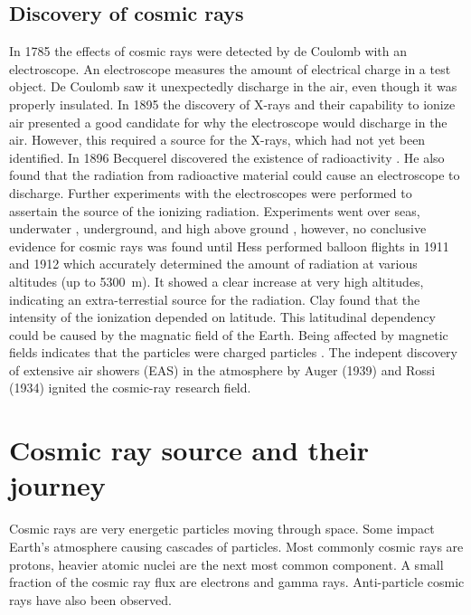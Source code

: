 \subsection{Discovery of cosmic rays}

In 1785 the effects of cosmic rays were detected by de Coulomb \cite{fokkema2012hisparc} with an electroscope. An electroscope measures the amount of electrical charge in a test object. De Coulomb saw it unexpectedly discharge in the air, even though it was properly insulated. In 1895 the discovery of X-rays and their capability to ionize air \cite{flakus1981radiation} presented a good candidate for why the electroscope would discharge in the air. However, this required a source for the X-rays, which had not yet been identified. In 1896 Becquerel discovered the existence of radioactivity \cite{badash1965becquerel}. He also found that the radiation from radioactive material could cause an electroscope to discharge. Further experiments with the electroscopes were performed to assertain the source of the ionizing radiation. Experiments went over seas, underwater \cite{pacini2011sea}, underground, and high above ground \cite{angelis2013history}, however, no conclusive evidence for cosmic rays was found until Hess performed balloon flights in 1911 and 1912 which accurately determined the amount of radiation at various altitudes (up to \SI{5300}{\meter}). It showed a clear increase at very high altitudes, indicating an extra-terrestial source for the radiation. Clay \cite{clay1928latitude} found that the intensity of the ionization depended on latitude. This latitudinal dependency could be caused by the magnatic field of the Earth. Being affected by magnetic fields indicates that the particles were charged particles \cite{compton1932charged}. The indepent discovery of extensive air showers (EAS) in the atmosphere by Auger (1939) \cite{auger1939eas} and Rossi (1934) \cite{rossi1934eas} ignited the cosmic-ray research field.


\section{Cosmic ray source and their journey}

Cosmic rays are very energetic particles moving through space. Some impact Earth's atmosphere causing cascades of particles. Most commonly cosmic rays are protons, heavier atomic nuclei are the next most common component. A small fraction of the cosmic ray flux are electrons and gamma rays. Anti-particle cosmic rays have also been observed.

